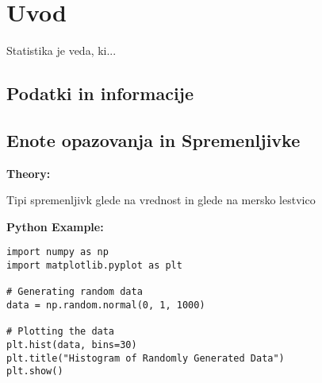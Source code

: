 \section{Uvod}

Statistika je veda, ki...

\subsection*{Podatki in informacije}

\subsection*{Enote opazovanja in Spremenljivke}

\begin{multicols}{2}
        \noindent
        \textbf{Theory:}

Tipi spremenljivk glede na vrednost in glede na mersko lestvico

\columnbreak

\textbf{Python Example:}

\begin{verbatim}
import numpy as np
import matplotlib.pyplot as plt

# Generating random data
data = np.random.normal(0, 1, 1000)

# Plotting the data
plt.hist(data, bins=30)
plt.title("Histogram of Randomly Generated Data")
plt.show()
\end{verbatim}
\end{multicols}
